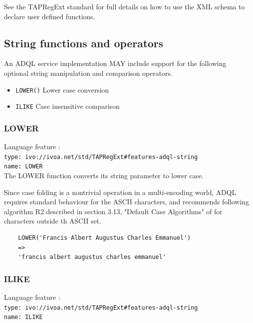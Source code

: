 \documentclass[11pt,a4paper]{ivoa}
\begin{document}
See the TAPRegExt standard for full details on how to use the
XML schema to declare user defined functions.

\subsection{String functions and operators}
\label{sec:string.functions}

An ADQL service implementation MAY include support for the following optional
string manipulation and comparison operators.

\begin{itemize}
    \item \verb:LOWER(): Lower case conversion
    \item \verb:ILIKE: Case insensitive comparison
\end{itemize}

\subsubsection{LOWER}
\label{sec:string.functions.lower}
{\footnotesize Language feature :}\\
{\footnotesize \verb|type: ivo://ivoa.net/std/TAPRegExt#features-adql-string|}\\
{\footnotesize \verb|name: LOWER|}\\

The LOWER function converts its string parameter to lower case.

Since case folding is a nontrivial operation in a multi-encoding world,
ADQL requires standard behaviour for the ASCII characters, and recommends
following algorithm R2 described in section 3.13, "Default Case Algorithms"
of \citet{std:UNICODE} for characters outside th ASCII set.

\begin{verbatim}
    LOWER('Francis Albert Augustus Charles Emmanuel')
    =>
    'francis albert augustus charles emmanuel'
\end{verbatim}

\subsubsection{ILIKE}
\label{sec:string.functions.ilike}
{\footnotesize Language feature :}\\
{\footnotesize \verb|type: ivo://ivoa.net/std/TAPRegExt#features-adql-string|}\\
{\footnotesize \verb|name: ILIKE|}\\
\end{document}

